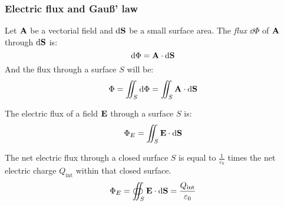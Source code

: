 \documentclass[../../../main.tex]{subfiles}
\begin{document}
\begin{multicols}{2}
  \subsubsection*{Electric flux and Gau\ss' law}
  \begin{definition}
    Let $\vb{A}$ be a vectorial field and $\dd\vb{S}$ be a small surface area. The \textit{flux $\dd \Phi$} of $\vb{A}$ through $\dd \vb{S}$ is:
    $$\dd \Phi=\vb{A}\cdot\dd\vb{S}$$ And the flux through a surface $S$ will be:
    $$\Phi=\iint_S \dd\Phi=\iint_S\vb{A}\cdot \dd\vb{S}$$
  \end{definition}
  \begin{corollary}
    The electric flux of a field $\vb{E}$ through a surface $S$ is:
    $$\Phi_E=\iint_S\vb{E}\cdot \dd\vb{S}$$
  \end{corollary}
  \begin{law}
    The net electric flux through a closed surface $S$ is equal to $\frac{1}{\varepsilon_0}$ times the net electric charge $Q_\text{int}$ within that closed surface.
    $$\Phi_E=\oiint_S\vb{E}\cdot\dd\vb{S}=\frac{Q_\text{int}}{\varepsilon_0}$$
  \end{law}

\end{multicols}
\end{document}
